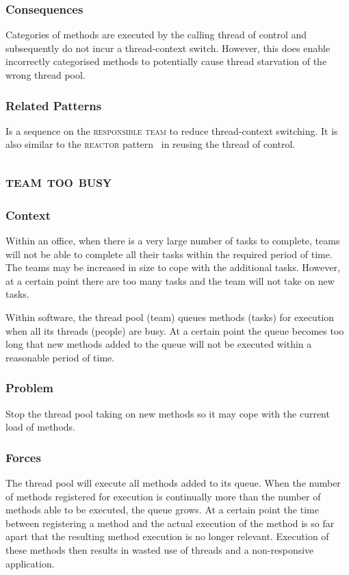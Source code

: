 \documentclass[prodmode]{style/acmlarge}
\begin{document}
\subsubsection*{Consequences} Categories of methods are executed by the calling
thread of control and subsequently do not incur a thread-context switch.
However, this does enable incorrectly categorised methods to potentially cause
thread starvation of the wrong thread pool.

\subsubsection*{Related Patterns} Is a sequence on the \textsc{responsible team}
to reduce thread-context switching.  It is also similar to the \textsc{reactor}
pattern~\cite{reactor} in reusing the thread of control.



\subsection{\textsc{\textbf{team too busy}}}

\subsubsection*{Context} Within an office, when there is a very large number of
tasks to complete, teams will not be able to complete all their tasks within the
required period of time.  The teams may be increased in size to cope with the
additional tasks.  However, at a certain point there are too many tasks and the
team will not take on new tasks.

Within software, the thread pool (team) queues methods (tasks) for execution
when all its threads (people) are busy.  At a certain point the queue becomes
too long that new methods added to the queue will not be executed within a
reasonable period of time.

\subsubsection*{\textbf{Problem}} Stop the thread pool taking on new methods so it may
cope with the current load of methods.

\subsubsection*{Forces} The thread pool will execute all methods added to its
queue.  When the number of methods registered for execution is continually more
than the number of methods able to be executed, the queue grows.  At a certain
point the time between registering a method and the actual execution of the
method is so far apart that the resulting method execution is no longer
relevant.  Execution of these methods then results in wasted use of threads and
a non-responsive application.
\end{document}
